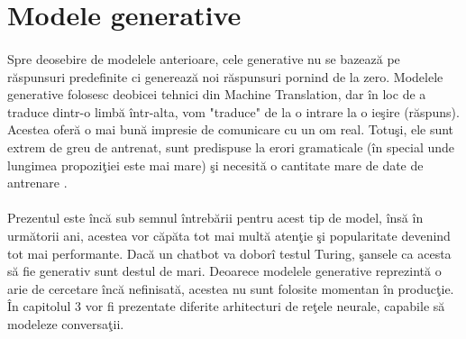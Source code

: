 \section{Modele generative}

\paragraph{}
Spre deosebire de modelele anterioare, cele generative nu se bazeaz\u a pe r\u aspunsuri predefinite ci genereaz\u a noi r\u aspunsuri pornind de la zero. Modelele generative folosesc deobicei tehnici din Machine Translation, dar \^ in loc de a traduce dintr-o limb\u a \^ intr-alta, vom "traduce" de la o intrare la o ie\c sire (r\u aspuns). Acestea ofer\u a o mai bun\u a impresie de comunicare cu un om real. Totu\c si, ele sunt extrem de greu de antrenat, sunt predispuse la erori gramaticale (\^ in special unde lungimea propozi\c tiei este mai mare) \c si necesit\u a o cantitate mare de date de antrenare \cite{wildml-chatbots}.

\paragraph{}
Prezentul este \^ inc\u a sub semnul \^ intreb\u arii pentru acest tip de model, \^ ins\u a \^ in urm\u atorii ani, acestea vor c\u ap\u ata tot mai mult\u a aten\c tie \c si popularitate devenind tot mai performante. Dac\u a un chatbot va dobor\^ i testul Turing, \c sansele ca acesta s\u a fie generativ sunt destul de mari. Deoarece modelele generative reprezint\u a o arie de cercetare \^ inc\u a nefinisat\u a, acestea nu sunt folosite momentan \^ in produc\c tie. \^ In capitolul 3 vor fi prezentate diferite arhitecturi de re\c tele neurale, capabile s\u a modeleze conversa\c tii.